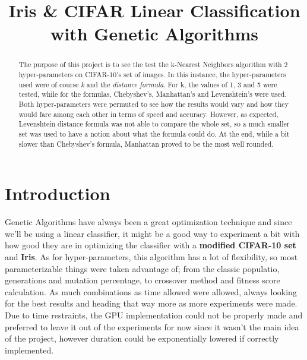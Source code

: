 \documentclass[conference,compsoc]{IEEEtran}
\begin{document}
\title{Iris \& CIFAR Linear Classification with Genetic Algorithms}

\author{
}

\maketitle

\begin{abstract}
The purpose of this project is to see the test the k-Nearest Neighbors algorithm with 2 hyper-parameters on CIFAR-10's set of images. In this instance, the hyper-parameters used were of course \textit{k} and the \textit{distance formula}. For k, the values of 1, 3 and 5 were tested, while for the formulas, Chebyshev's, Manhattan's and Levenshtein's were used. Both hyper-parameters were permuted to see how the results would vary and how they would fare among each other in terms of speed and accuracy. However, as expected, Levenshtein distance formula was not able to compare the whole set, so a much smaller set was used to have a notion about what the formula could do. At the end, while a bit slower than Chebyshev's formula, Manhattan proved to be the most well rounded.
\end{abstract}

\IEEEpeerreviewmaketitle

\section{Introduction}
Genetic Algorithms have always been a great optimization technique and since we'll be using a linear classifier, it might be a good way to experiment a bit with how good they are in optimizing the classifier with a \textbf{modified CIFAR-10 set} and \textbf{Iris}. As for hyper-parameters, this algorithm has a lot of flexibility, so most parameterizable things were taken advantage of; from the classic populatio, generations and mutation percentage, to crossover method and fitness score calculation. As much combinations as time allowed were allowed, always looking for the best results and heading that way more as more experiments were made. Due to time restraints, the GPU implementation could not be properly made and preferred to leave it out of the experiments for now since it wasn't the main idea of the project, however duration could be exponentially lowered if correctly implemented.
\end{document}
